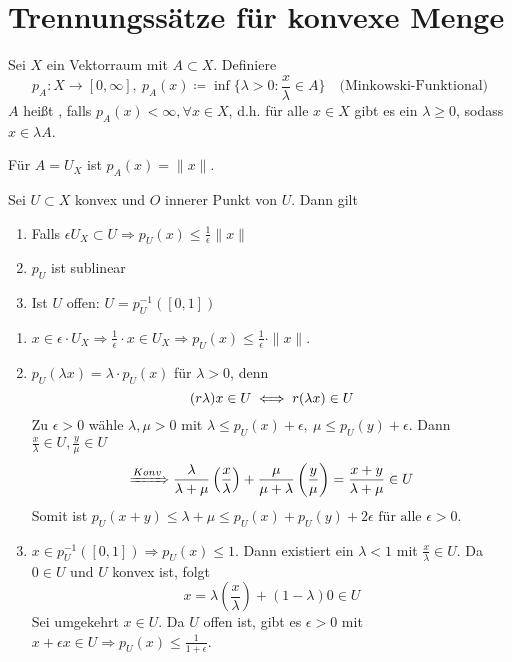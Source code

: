 

\section{Trennungssätze für konvexe Menge}


\begin{definition}
	Sei $X$ ein Vektorraum mit $A \subset X$. Definiere 
		\[ p_{A} \colon X \rightarrow [0, \infty], ~ p_{A}(x) \coloneqq \inf \{ \lambda > 0 : \frac{x}{\lambda} \in A \} \quad \text{(Minkowski-Funktional)} \]
	$A$ hei{\ss}t , falls $p_{A}(x) < \infty, \forall x \in X$, d.h. für alle $ x \in X$ gibt es ein $\lambda \geq 0$, sodass $x \in \lambda A$.
\end{definition}


\begin{beispiel}
	Für $A = U_{X}$ ist $p_{A}(x) = \| x \|$.	
\end{beispiel}


\begin{prop}
	Sei $U \subset X$ konvex und $O$ innerer Punkt von $U$. Dann gilt
	\begin{enumerate}[label=\alph*\upshape)]
		\item Falls $\epsilon U_{X} \subset U \Rightarrow p_{U}(x) \leq \frac{1}{\epsilon} \| x \|$
		\item $p_{U}$ ist sublinear
		\item Ist $U$ offen: $U = p_{U}^{-1}([0 , 1])$
	\end{enumerate}	
\end{prop}

\begin{beweis}
	\begin{enumerate}[label=\alph*\upshape)]
		\item $x \in \epsilon \cdot U_{X} \Rightarrow \frac{1}{\epsilon} \cdot x \in U_{X} \Rightarrow p_{U}(x) \leq \frac{1}{\epsilon} \cdot \| x \|$.
		\item $p_{U}(\lambda x ) = \lambda \cdot p_{U}(x)$ für $\lambda > 0$, denn 
			\[ (r \lambda) x \in U \iff r(\lambda x) \in U \] %
			Zu $\epsilon > 0$ wähle $\lambda, \mu > 0$ mit  $\lambda \leq p_{U}(x) + \epsilon, ~\mu \leq p_{U}(y) + \epsilon$. Dann $\frac{x}{\lambda} \in U, \frac{y}{\mu} \in U$ 
			\[ \xRightarrow[]{Konv} \frac{\lambda}{\lambda + \mu} \left( \frac{x}{\lambda} \right) + \frac{\mu}{\mu + \lambda} \left( \frac{y}{\mu} \right) = \frac{x + y}{\lambda + \mu} \in U \]
			Somit ist $p_{U}(x + y) \leq \lambda + \mu \leq p_{U}(x) + p_{U}(y) + 2 \epsilon \text{ für alle } \epsilon > 0$.
		\item $x \in p_{U}^{-1}([0, 1]) \Rightarrow p_{U}(x) \leq 1$. Dann existiert ein $\lambda < 1$ mit $\frac{x}{\lambda} \in U$. Da $0 \in U$ und $U$ konvex ist, folgt
			\[ x = \lambda \left( \frac{x}{\lambda} \right) + (1 - \lambda) 0 \in U \]
			Sei umgekehrt $x \in U$. Da $U$ offen ist, gibt es $\epsilon > 0$ mit $x + \epsilon x \in U \Rightarrow p_{U}(x) \leq \frac{1}{1 + \epsilon}$.
	\end{enumerate}
\end{beweis}


